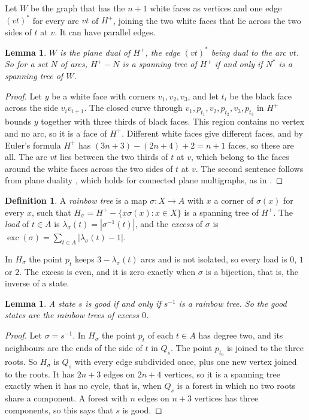 \documentclass[10pt]{amsart}
\numberwithin{equation}{section}
\newtheorem{lemma}[equation]{Lemma}
\theoremstyle{definition}
\newtheorem{definition}[equation]{Definition}
\theoremstyle{remark}
\newcommand{\exc}{\operatorname{exc}}
\newcommand{\Hp}{H^{+}}
\begin{document}
Let $W$ be the graph that has the $n+1$ white faces as vertices and one edge $(vt)^*$ for every arc $vt$ of $\Hp$, joining the two white faces that lie across the two sides of $t$ at $v$.
It can have parallel edges.

\begin{lemma}\label{lem:dual}
$W$ is the plane dual of $\Hp$, the edge $(vt)^*$ being dual to the arc $vt$.
So for a set $N$ of arcs, $\Hp-N$ is a spanning tree of $\Hp$ if and only if $N^*$ is a spanning tree of $W$.
\end{lemma}

\begin{proof}
Let $y$ be a white face with corners $v_1,v_2,v_3$, and let $t_i$ be the black face across the side $v_iv_{i+1}$.
The closed curve through $v_1,p_{t_1},v_2,p_{t_2},v_3,p_{t_3}$ in $\Hp$ bounds $y$ together with three thirds of black faces.
This region contains no vertex and no arc, so it is a face of $\Hp$.
Different white faces give different faces, and by Euler's formula $\Hp$ has $(3n+3)-(2n+4)+2=n+1$ faces, so these are all.
The arc $vt$ lies between the two thirds of $t$ at $v$, which belong to the faces around the white faces across the two sides of $t$ at $v$.
The second sentence follows from plane duality \cite[Proposition~4.6.1]{Diestel}, which holds for connected plane multigraphs, as in \cite[Section~2]{Paper}.
\end{proof}

\begin{definition}
A \emph{rainbow tree} is a map $\sigma\colon X\to A$ with $x$ a corner of $\sigma(x)$ for every $x$, such that $H_\sigma=\Hp-\{x\sigma(x):x\in X\}$ is a spanning tree of $\Hp$.
The \emph{load} of $t\in A$ is $\lambda_\sigma(t)=|\sigma^{-1}(t)|$, and the \emph{excess} of $\sigma$ is $\exc(\sigma)=\sum_{t\in A}|\lambda_\sigma(t)-1|$.
\end{definition}

In $H_\sigma$ the point $p_t$ keeps $3-\lambda_\sigma(t)$ arcs and is not isolated, so every load is $0$, $1$ or $2$.
The excess is even, and it is zero exactly when $\sigma$ is a bijection, that is, the inverse of a state.

\begin{lemma}\label{lem:good}
A state $s$ is good if and only if $s^{-1}$ is a rainbow tree.
So the good states are the rainbow trees of excess $0$.
\end{lemma}

\begin{proof}
Let $\sigma=s^{-1}$.
In $H_\sigma$ the point $p_t$ of each $t\in A$ has degree two, and its neighbours are the ends of the side of $t$ in $Q_s$.
The point $p_{t_0}$ is joined to the three roots.
So $H_\sigma$ is $Q_s$ with every edge subdivided once, plus one new vertex joined to the roots.
It has $2n+3$ edges on $2n+4$ vertices, so it is a spanning tree exactly when it has no cycle, that is, when $Q_s$ is a forest in which no two roots share a component.
A forest with $n$ edges on $n+3$ vertices has three components, so this says that $s$ is good.
\end{proof}
\end{document}
